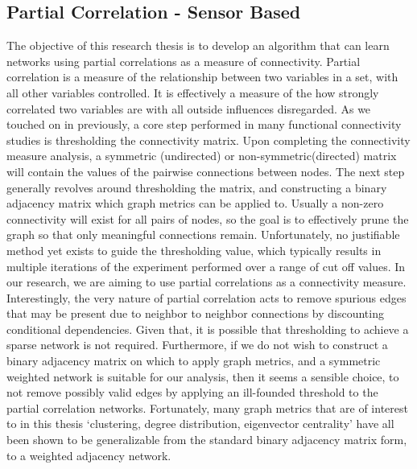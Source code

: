 \documentclass[11pt]{article}
\begin{document}
\subsection{Partial Correlation - Sensor Based}
The objective of this research thesis is to develop an algorithm that can learn networks using partial correlations as a measure of connectivity. Partial correlation is a measure of the relationship between two variables in a set, with all other variables controlled. It is effectively a measure of the how strongly correlated two variables are with all outside influences disregarded. As we touched on in previously, a core step performed in many functional connectivity studies is thresholding the connectivity matrix. Upon completing the connectivity measure analysis, a symmetric (undirected) or non-symmetric(directed) matrix will contain the values of the pairwise connections between nodes. The next step generally revolves around thresholding the matrix, and constructing a binary adjacency matrix which graph metrics can be applied to. Usually a non-zero connectivity will exist for all pairs of nodes, so the goal is to effectively prune the graph so that only meaningful connections remain. Unfortunately, no justifiable method yet exists to guide the thresholding value, which typically results in multiple iterations of the experiment performed over a range of cut off values. In our research, we are aiming to use partial correlations as a connectivity measure. Interestingly, the very nature of partial correlation acts to remove spurious edges that may be present due to neighbor to neighbor connections by discounting conditional dependencies. Given that, it is possible that thresholding to achieve a sparse network is not required. Furthermore, if we do not wish to construct a binary adjacency matrix on which to apply graph metrics, and a symmetric weighted network is suitable for our analysis, then it seems a sensible choice, to not remove possibly valid edges by applying an ill-founded threshold to the partial correlation networks. Fortunately, many graph metrics that are of interest to in this thesis `clustering, degree distribution, eigenvector centrality' have all been shown to be generalizable from the standard binary adjacency matrix form, to a weighted adjacency network.      

\pagebreak

%


\end{document}
